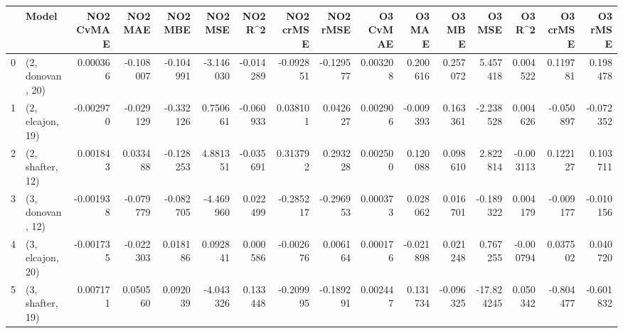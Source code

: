 \begin{tabular}{llrrrrrrrrrrrrrr}
\toprule
{} &             Model &  NO2 CvMAE &   NO2 MAE &   NO2 MBE &   NO2 MSE &   NO2 R\textasciicircum2 &  NO2 crMSE &  NO2 rMSE &  O3 CvMAE &    O3 MAE &    O3 MBE &     O3 MSE &    O3 R\textasciicircum2 &  O3 crMSE &   O3 rMSE \\
\midrule
0 &  (2, donovan, 20) &   0.000366 & -0.108007 & -0.104991 & -3.146030 & -0.014289 &  -0.092851 & -0.129577 &  0.003208 &  0.200616 &  0.257072 &   5.457418 &  0.004522 &  0.119781 &  0.198478 \\
1 &  (2, elcajon, 19) &  -0.002970 & -0.029129 & -0.332126 &  0.750661 & -0.060933 &   0.038101 &  0.042627 &  0.002906 & -0.009393 &  0.163361 &  -2.238528 &  0.004626 & -0.050897 & -0.072352 \\
2 &  (2, shafter, 12) &   0.001843 &  0.033488 & -0.128253 &  4.881351 & -0.035691 &   0.313792 &  0.293228 &  0.002500 &  0.120088 &  0.098610 &   2.822814 & -0.003113 &  0.122127 &  0.103711 \\
3 &  (3, donovan, 12) &  -0.001938 & -0.079779 & -0.082705 & -4.469960 &  0.022499 &  -0.285217 & -0.296953 &  0.000373 &  0.028062 &  0.016701 &  -0.189322 &  0.004179 & -0.009177 & -0.010156 \\
4 &  (3, elcajon, 20) &  -0.001735 & -0.022303 &  0.018186 &  0.092841 &  0.000586 &  -0.002676 &  0.006164 &  0.000176 & -0.021898 &  0.021248 &   0.767255 & -0.000794 &  0.037502 &  0.040720 \\
5 &  (3, shafter, 19) &   0.007171 &  0.050560 &  0.092039 & -4.043326 &  0.133448 &  -0.209995 & -0.189291 &  0.002447 &  0.131734 & -0.096325 & -17.824245 &  0.050342 & -0.804477 & -0.601832 \\
\bottomrule
\end{tabular}
